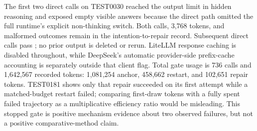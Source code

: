 \documentclass{article}
\begin{document}
The first two direct calls on TEST0030 reached the output limit in hidden reasoning and exposed empty visible answers because the direct path omitted the full runtime's explicit non-thinking switch. Both calls, 3,768 tokens, and malformed outcomes remain in the intention-to-repair record. Subsequent direct calls pass \texttt{}; no prior output is deleted or rerun. LiteLLM response caching is disabled throughout, while DeepSeek's automatic provider-side prefix-cache accounting is separately outside that client flag. Total gate usage is 736 calls and 1,642,567 recorded tokens: 1,081,254 anchor, 458,662 restart, and 102,651 repair tokens. TEST0181 shows only that repair succeeded on its first attempt while a matched-budget restart failed; comparing first-draw tokens with a fully spent failed trajectory as a multiplicative efficiency ratio would be misleading. This stopped gate is positive mechanism evidence about two observed failures, but not a positive comparative-method claim.
\end{document}
